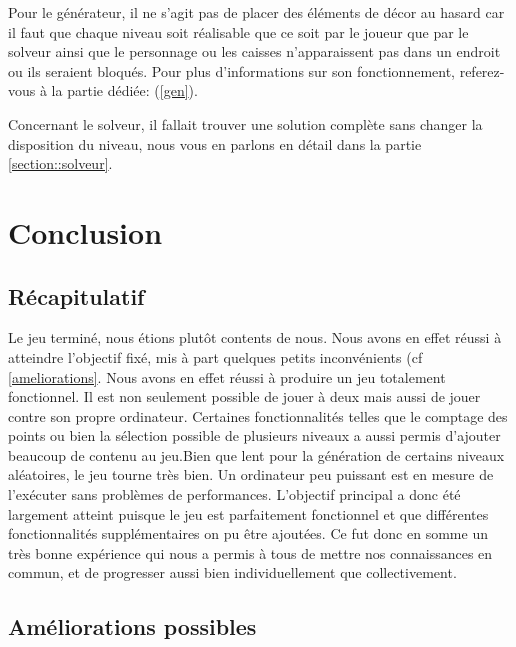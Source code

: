 \documentclass[a4paper,12pt]{article}
\begin{document}
Pour le générateur, il ne s'agit pas de placer des éléments de décor au hasard car il faut que chaque niveau soit réalisable que ce soit par le joueur que par le solveur ainsi que le personnage ou les caisses n'apparaissent pas dans un endroit ou ils seraient bloqués. Pour plus d'informations sur son fonctionnement, referez-vous à la partie dédiée: (\ref{gen}).

Concernant le solveur, il fallait trouver une solution complète sans changer la disposition du niveau, nous vous en parlons en détail dans la partie \ref{section::solveur}.

\newpage

\section{Conclusion}
\subsection{Récapitulatif}

Le jeu terminé, nous étions plutôt contents de nous. Nous avons en effet réussi à atteindre l'objectif fixé, mis à part quelques petits inconvénients (cf \ref{ameliorations}. Nous avons en effet réussi à produire un jeu totalement fonctionnel. Il est non seulement possible de jouer à deux mais aussi de jouer contre son propre ordinateur. Certaines fonctionnalités telles que le comptage des points ou bien la sélection possible de plusieurs niveaux a aussi permis d'ajouter beaucoup de contenu au jeu.Bien que lent pour la génération de certains niveaux aléatoires, le jeu tourne très bien. Un ordinateur peu puissant est en mesure de l'exécuter sans problèmes de performances. L'objectif principal a donc été largement atteint puisque le jeu est parfaitement fonctionnel et que différentes fonctionnalités supplémentaires on pu être ajoutées. Ce fut donc en somme un très bonne expérience qui nous a permis à tous de mettre nos connaissances en commun, et de progresser aussi bien individuellement que collectivement. 

\subsection{Améliorations possibles}
\label{Améliorations}
\end{document}
